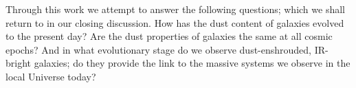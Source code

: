 Through this work we attempt to answer the following questions; which we shall return to in our closing discussion. How has the dust content of galaxies evolved to the present day? Are the dust properties of galaxies the same at all cosmic epochs? And in what evolutionary stage do we observe dust-enshrouded, IR-bright galaxies; do they provide the link to the massive systems we observe in the local Universe today?

